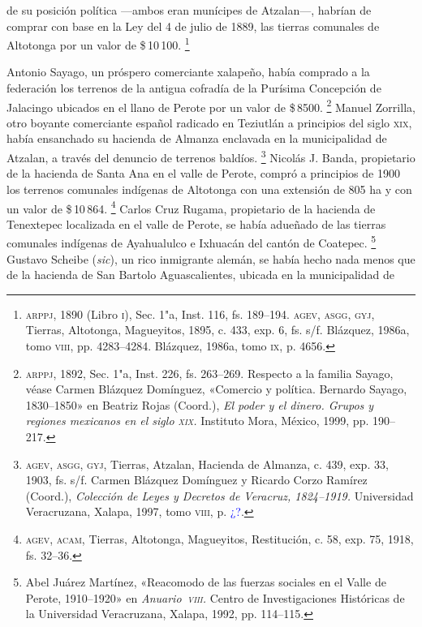 \documentclass[14pt,twoside,final]{extbook} %
\let\oldfootnote\footnote
\renewcommand\footnote[1]{%
\oldfootnote{\hspace{1mm}#1}}
\begin{document}
de su posición política ---ambos eran munícipes de Atzalan---, habrían de comprar con base en la Ley del 4 de julio de 1889, las tierras comunales de Altotonga por un valor de \$\,10\,100.\footnote{\textsc{arppj}, 1890 (Libro \textsc{i}), Sec. 1"a, Inst. 116, fs. 189--194. \textsc{agev, asgg, gyj}, Tierras, Altotonga, Magueyitos, 1895, c. 433, exp. 6, fs. s/f. Blázquez, 1986a, tomo \textsc{viii}, pp. 4283--4284. Blázquez, 1986a, tomo \textsc{ix}, p. 4656.}

Antonio Sayago, un próspero comerciante xalapeño, había comprado a la federación los terrenos de la antigua cofradía de la Purísima Concepción de Jalacingo ubicados en el llano de Perote por un valor de \$\,8500.\footnote{\textsc{arppj}, 1892, Sec. 1"a, Inst. 226, fs. 263--269. Respecto a la familia Sayago,\index[nombres]{Sayago!familia} véase Carmen Blázquez Domínguez, «Comercio y política. Bernardo Sayago, 1830--1850» en Beatriz Rojas (Coord.), \emph{El poder y el dinero. Grupos y regiones mexicanos en el siglo \textsc{xix}.} Instituto Mora, México, 1999, pp. 190--217.} Manuel Zorrilla, otro boyante comerciante español radicado en Teziutlán a principios del siglo \textsc{xix}, había ensanchado su hacienda de Almanza enclavada en la municipalidad de Atzalan, a través del denuncio de terrenos baldíos.\footnote{\textsc{agev, asgg, gyj}, Tierras, Atzalan, Hacienda de Almanza, c. 439, exp. 33, 1903, fs. s/f. Carmen Blázquez Domínguez y Ricardo Corzo Ramírez (Coord.), \emph{Colección de Leyes y Decretos de Veracruz, 1824--1919.} Universidad Veracruzana, Xalapa, 1997, tomo \textsc{viii}, p. \textcolor{blue}{¿?}.} Nicolás J. Banda, propietario de la hacienda de Santa Ana en el valle de Perote, compró a principios de 1900 los terrenos comunales indígenas de Altotonga con una extensión de 805 ha y con un valor de \$\,10\,864.\footnote{\textsc{agev, acam}, Tierras, Altotonga, Magueyitos, Restitución, c. 58, exp. 75, 1918, fs. 32--36.} Carlos Cruz Rugama, propietario de la hacienda de Tenextepec localizada en el valle de Perote, se había adueñado de las tierras comunales indígenas de Ayahualulco e Ixhuacán del cantón de Coatepec.\footnote{Abel Juárez Martínez, «Reacomodo de las fuerzas sociales en el Valle de Perote, 1910--1920» en \textit{Anuario~\textsc{viii}.} Centro de Investigaciones Históricas de la Universidad Veracruzana, Xalapa, 1992, pp. 114--115.} Gustavo Scheibe (\emph{sic}), un rico inmigrante alemán, se había hecho nada menos que de la hacienda de San Bartolo Aguascalientes, ubicada en la municipalidad de 
\end{document}
